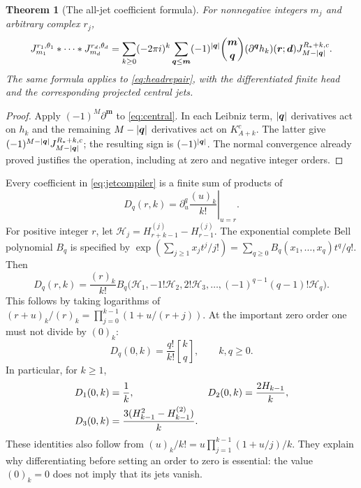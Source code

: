 \documentclass[11pt,a4paper]{article}
\numberwithin{equation}{section}
\newtheorem{theorem}{Theorem}[section]
\theoremstyle{definition}\newtheorem{definition}[theorem]{Definition}
\theoremstyle{remark}\newtheorem{remark}[theorem]{Remark}
\newcommand{\rv}{\boldsymbol r}\newcommand{\mv}{\boldsymbol m}
\newcommand{\stir}[2]{\genfrac{[}{]}{0pt}{}{#1}{#2}}
\begin{document}
\begin{theorem}[The all-jet coefficient formula]\label{thm:jets}
For nonnegative integers $m_j$ and arbitrary complex $r_j$,
\begin{align}
 J_{m_1}^{r_1,\theta_1}*\cdots*J_{m_d}^{r_d,\theta_d}
 =\sum_{k\ge0}(-2\pi i)^k
   \sum_{\qv\le\mv}(-1)^{|\qv|}\binom{\mv}{\qv}
   (\partial^{\qv}h_k)(\rv;\dv)
     J_{M-|\qv|}^{R_*+k,c}.
 \label{eq:jetcompiler}
\end{align}
The same formula applies to \eqref{eq:headrepair}, with the differentiated
finite head and the corresponding projected central jets.
\end{theorem}
\begin{proof}
Apply $(-1)^M\partial^{\mv}$ to \eqref{eq:central}. In each Leibniz
term, $|\boldsymbol q|$ derivatives act on $h_k$ and the remaining $M-|\boldsymbol q|$
derivatives act on $K_{A+k}^c$. The latter give
$(-1)^{M-|\boldsymbol q|}J_{M-|\boldsymbol q|}^{R_*+k,c}$; the resulting sign is
$(-1)^{|\boldsymbol q|}$. The normal convergence already proved justifies the
operation, including at zero and negative integer orders.
\end{proof}

Every coefficient in \eqref{eq:jetcompiler} is a finite sum of products
of
\begin{equation}
 D_q(r,k)=\left.\partial_u^q\frac{(u)_k}{k!}\right|_{u=r}.
 \label{eq:Ddef}
\end{equation}
For positive integer $r$, let
$\mathcal H_j=H_{r+k-1}^{(j)}-H_{r-1}^{(j)}$.
The exponential complete Bell polynomial $B_q$ is specified by
$\exp(\sum_{j\ge1}x_jt^j/j!)=\sum_{q\ge0}B_q(x_1,\ldots,x_q)t^q/q!$.
Then
\begin{equation}
 D_q(r,k)=\frac{(r)_k}{k!}
 B_q\bigl(\mathcal H_1,-1!\mathcal H_2,2!\mathcal H_3,
                 \ldots,(-1)^{q-1}(q-1)!\mathcal H_q\bigr).
 \label{eq:Dpositive}
\end{equation}
This follows by taking logarithms of
$(r+u)_k/(r)_k=\prod_{j=0}^{k-1}(1+u/(r+j))$.
At the important zero order one must not divide by $(0)_k$:
\begin{equation}
 D_q(0,k)=\frac{q!}{k!}\stir{k}{q},\qquad k,q\ge0.
 \label{eq:Dzero}
\end{equation}
In particular, for $k\ge1$,
\begin{align}
 D_1(0,k)&=\frac1k,&
 D_2(0,k)&=\frac{2H_{k-1}}k,\notag\\
 D_3(0,k)&=\frac{3(H_{k-1}^2-H_{k-1}^{(2)})}{k}.
 \label{eq:Dlow}
\end{align}
These identities also follow from
$(u)_k/k!=u\prod_{j=1}^{k-1}(1+u/j)/k$.
They explain why differentiating before setting an order to zero is
essential: the value $(0)_k=0$ does not imply that its jets vanish.
\end{document}
